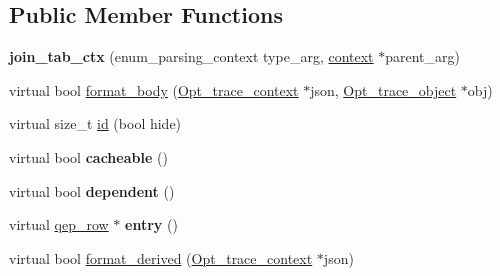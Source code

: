 \subsection*{Public Member Functions}
\begin{DoxyCompactItemize}
\item 
\mbox{\label{classopt__explain__json__namespace_1_1join__tab__ctx_ae165fcbd2b7eda34871c3cc4396a6771}} 
{\bfseries join\+\_\+tab\+\_\+ctx} (enum\+\_\+parsing\+\_\+context type\+\_\+arg, \mbox{\hyperlink{classopt__explain__json__namespace_1_1context}{context}} $\ast$parent\+\_\+arg)
\item 
virtual bool \mbox{\hyperlink{classopt__explain__json__namespace_1_1join__tab__ctx_a74c2ce48b173e41e0878b549ea44e4b0}{format\+\_\+body}} (\mbox{\hyperlink{classOpt__trace__context}{Opt\+\_\+trace\+\_\+context}} $\ast$json, \mbox{\hyperlink{classOpt__trace__object}{Opt\+\_\+trace\+\_\+object}} $\ast$obj)
\item 
virtual size\+\_\+t \mbox{\hyperlink{classopt__explain__json__namespace_1_1join__tab__ctx_a294e12d9416adb645ab30841bddda4e0}{id}} (bool hide)
\item 
\mbox{\label{classopt__explain__json__namespace_1_1join__tab__ctx_a632dbd223f76c3ce0fd21c88532b539b}} 
virtual bool {\bfseries cacheable} ()
\item 
\mbox{\label{classopt__explain__json__namespace_1_1join__tab__ctx_a87c8af16dcfcb0056e1a5c8d785797f7}} 
virtual bool {\bfseries dependent} ()
\item 
\mbox{\label{classopt__explain__json__namespace_1_1join__tab__ctx_a7ad4e9c9e3e1551cfcd38e83dac3f01f}} 
virtual \mbox{\hyperlink{classqep__row}{qep\+\_\+row}} $\ast$ {\bfseries entry} ()
\item 
\mbox{\label{classopt__explain__json__namespace_1_1join__tab__ctx_ad60b24a2ba18bc18727aa01a3ddbce5b}} 
virtual bool \mbox{\hyperlink{classopt__explain__json__namespace_1_1join__tab__ctx_ad60b24a2ba18bc18727aa01a3ddbce5b}{format\+\_\+derived}} (\mbox{\hyperlink{classOpt__trace__context}{Opt\+\_\+trace\+\_\+context}} $\ast$json)

\end{DoxyCompactItemize}
